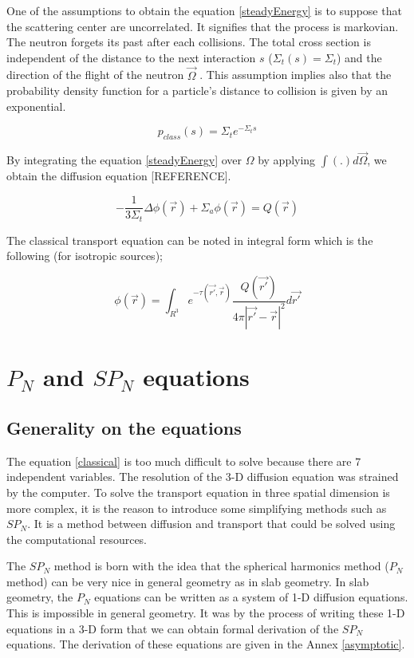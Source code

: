 \documentclass[a4paper, 12pt]{report}
\begin{document}
One of the assumptions to obtain the equation \ref{steadyEnergy} is to suppose that the scattering center are uncorrelated. It signifies that the process is markovian. The neutron forgets its past after each collisions. The total cross section is independent of the distance to the next interaction $s$ ($\Sigma_t(s) = \Sigma_t$) and the direction of the flight of the neutron $\vec{\Omega}$ . This assumption implies also that the probability density function for a particle's distance to collision is given by an exponential.

\begin{equation}\label{pdfclass}
p_{class}(s) = \Sigma_t e^{-\Sigma_t s}
\end{equation}

By integrating the equation \ref{steadyEnergy} over $\Omega$ by applying $\int (.) d\vec{\Omega}$, we obtain the diffusion equation [REFERENCE].

\begin{equation}\label{eqsp1}
-\frac{1}{3\Sigma_t}\Delta \phi(\vec{r}) + \Sigma_a \phi (\vec{r}) = Q(\vec{r})
\end{equation}

The classical transport equation can be noted in integral form which is the following (for isotropic sources);

\begin{equation}
\phi(\vec{r}) = \int_{R^3} e^{-\tau(\vec{r'},\vec{r})}\frac{Q(\vec{r'})}{4\pi |\vec{r'}-\vec{r}|^2} d\vec{r'}
\end{equation}

\section{$P_N$ and $SP_N$ equations}

\subsection{Generality on the equations}

The equation \ref{classical} is too much difficult to solve because there are 7 independent variables. The resolution of the 3-D diffusion equation was strained by the computer. To solve the transport equation in three spatial dimension is more complex, it is the reason to introduce some simplifying methods such as $SP_N$. It is a method between diffusion and transport that could be solved using the computational resources.

The $SP_N$ method is born with the idea that the spherical harmonics method ($P_N$ method) can be very nice in general geometry as in slab geometry. In slab geometry, the $P_N$ equations can be written as a system of 1-D diffusion equations. This is impossible in general geometry. It
was by the process of writing these 1-D equations in a 3-D form that we can obtain formal derivation of the $SP_N$ equations. The derivation of these equations are given in the Annex \ref{asymptotic}.
\end{document}
